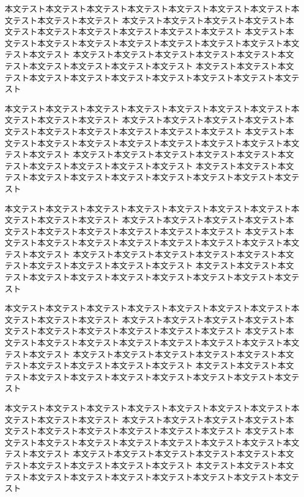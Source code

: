 \documentclass[uplatex,dvipdfmx,a4paper,twocolumn,base=11pt,jbase=11pt,ja=standard]{bxjsarticle}
\begin{document}
本文テスト本文テスト本文テスト本文テスト本文テスト本文テスト本文テスト本文テスト本文テスト本文テスト
本文テスト本文テスト本文テスト本文テスト本文テスト本文テスト本文テスト本文テスト本文テスト本文テスト
本文テスト本文テスト本文テスト本文テスト本文テスト本文テスト本文テスト本文テスト本文テスト本文テスト
本文テスト本文テスト本文テスト本文テスト本文テスト本文テスト本文テスト本文テスト本文テスト本文テスト
本文テスト本文テスト本文テスト本文テスト本文テスト本文テスト本文テスト本文テスト本文テスト本文テスト

本文テスト本文テスト本文テスト本文テスト本文テスト本文テスト本文テスト本文テスト本文テスト本文テスト
本文テスト本文テスト本文テスト本文テスト本文テスト本文テスト本文テスト本文テスト本文テスト本文テスト
本文テスト本文テスト本文テスト本文テスト本文テスト本文テスト本文テスト本文テスト本文テスト本文テスト
本文テスト本文テスト本文テスト本文テスト本文テスト本文テスト本文テスト本文テスト本文テスト本文テスト
本文テスト本文テスト本文テスト本文テスト本文テスト本文テスト本文テスト本文テスト本文テスト本文テスト

本文テスト本文テスト本文テスト本文テスト本文テスト本文テスト本文テスト本文テスト本文テスト本文テスト
本文テスト本文テスト本文テスト本文テスト本文テスト本文テスト本文テスト本文テスト本文テスト本文テスト
本文テスト本文テスト本文テスト本文テスト本文テスト本文テスト本文テスト本文テスト本文テスト本文テスト
本文テスト本文テスト本文テスト本文テスト本文テスト本文テスト本文テスト本文テスト本文テスト本文テスト
本文テスト本文テスト本文テスト本文テスト本文テスト本文テスト本文テスト本文テスト本文テスト本文テスト

本文テスト本文テスト本文テスト本文テスト本文テスト本文テスト本文テスト本文テスト本文テスト本文テスト
本文テスト本文テスト本文テスト本文テスト本文テスト本文テスト本文テスト本文テスト本文テスト本文テスト
本文テスト本文テスト本文テスト本文テスト本文テスト本文テスト本文テスト本文テスト本文テスト本文テスト
本文テスト本文テスト本文テスト本文テスト本文テスト本文テスト本文テスト本文テスト本文テスト本文テスト
本文テスト本文テスト本文テスト本文テスト本文テスト本文テスト本文テスト本文テスト本文テスト本文テスト

本文テスト本文テスト本文テスト本文テスト本文テスト本文テスト本文テスト本文テスト本文テスト本文テスト
本文テスト本文テスト本文テスト本文テスト本文テスト本文テスト本文テスト本文テスト本文テスト本文テスト
本文テスト本文テスト本文テスト本文テスト本文テスト本文テスト本文テスト本文テスト本文テスト本文テスト
本文テスト本文テスト本文テスト本文テスト本文テスト本文テスト本文テスト本文テスト本文テスト本文テスト
本文テスト本文テスト本文テスト本文テスト本文テスト本文テスト本文テスト本文テスト本文テスト本文テスト
\end{document}
